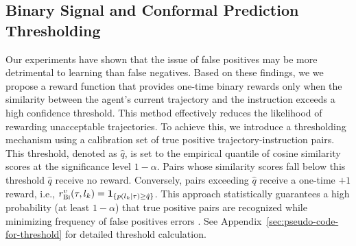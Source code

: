 \documentclass{article}
\theoremstyle{plain}
\theoremstyle{definition}
\theoremstyle{remark}
\begin{document}
\subsection{Binary Signal and Conformal Prediction Thresholding}
\label{sec:preferring-binary-signal}
Our experiments have shown that the issue of false positives may be more detrimental to learning than false negatives. Based on these findings, we we propose a reward function that provides one-time binary rewards only when the similarity between the agent's current trajectory and the instruction exceeds a high confidence threshold. This method effectively reduces the likelihood of rewarding unacceptable trajectories.
To achieve this, we introduce a thresholding mechanism using a calibration set of true positive trajectory-instruction pairs. This threshold, denoted as $\hat q$, is set to the empirical quantile of cosine similarity scores at the significance level $1 - \alpha$. Pairs whose similarity scores fall below this threshold $\hat q$ receive no reward. Conversely, pairs exceeding $\hat q$ receive a one-time $+1$ reward, i.e., $r^v_{\textsc{Bi}}(\tau, l_k) = \mathbf{1}_{\{p(l_k\mid \tau) \geq \hat q\}}$. This approach statistically guarantees a high probability (at least $1 - \alpha$) that true positive pairs are recognized while minimizing frequency of false positives errors \citep{sadinle2019least}. See Appendix~\ref{sec:pseudo-code-for-threshold} for detailed threshold calculation. 
\end{document}
